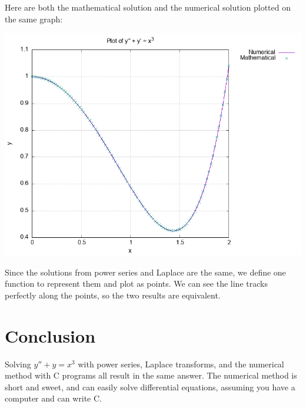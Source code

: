 \documentclass[letterpaper,twocolumn]{article}
\begin{document}
Here are both the mathematical solution and the numerical
solution plotted on the same graph:
\begin{center}
\includegraphics[width=1\textwidth]{./plot.png}
\end{center}
Since the solutions from power series and Laplace are the same, we define one function to represent them and plot as points. We can see the line tracks perfectly along the points, so the two results are equivalent. 

\section*{Conclusion}
Solving $y'' + y = x^3$ with power series, Laplace transforms, and the numerical method with C programs all result in the same answer. The numerical method is short and sweet, and can easily solve differential equations, assuming you have a computer and can write C.
\end{document}

